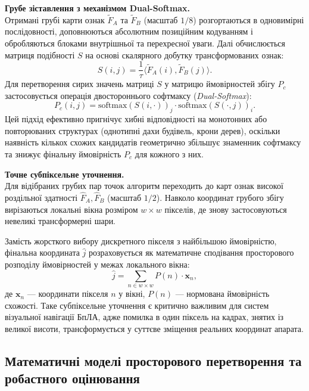 \documentclass[a4paper, 12pt, titlepage]{article}
\begin{document}
\textbf{Грубе зіставлення з механізмом Dual-Softmax.}\\
Отримані грубі карти ознак $\tilde{F}_A$ та $\tilde{F}_B$ (масштаб $1/8$) розгортаються в одновимірні послідовності, доповнюються абсолютним позиційним кодуванням і обробляються блоками внутрішньої та перехресної уваги. Далі обчислюється матриця подібності $S$ на основі скалярного добутку трансформованих ознак:
\begin{equation}
S(i, j) = \frac{1}{\tau} \langle \tilde{F}_A(i), \tilde{F}_B(j) \rangle.
\end{equation}
Для перетворення сирих значень матриці $S$ у матрицю ймовірностей збігу $P_c$ застосовується операція двостороннього софтмаксу (\textit{Dual-Softmax}):
\begin{equation}
P_{c}(i, j) = \text{softmax}(S(i, \cdot))_j \cdot \text{softmax}(S(\cdot, j))_i.
\end{equation}
Цей підхід ефективно пригнічує хибні відповідності на монотонних або повторюваних структурах (однотипні дахи будівель, крони дерев), оскільки наявність кількох схожих кандидатів геометрично збільшує знаменник софтмаксу та знижує фінальну ймовірність $P_c$ для кожного з них.

\textbf{Точне субпіксельне уточнення.}\\
Для відібраних грубих пар точок алгоритм переходить до карт ознак високої роздільної здатності $\hat{F}_A, \hat{F}_B$ (масштаб $1/2$). Навколо координат грубого збігу вирізаються локальні вікна розміром $w \times w$ пікселів, де знову застосовуються невеликі трансформерні шари.

Замість жорсткого вибору дискретного пікселя з найбільшою ймовірністю, фінальна координата $\hat{j}$ розраховується як математичне сподівання просторового розподілу ймовірностей у межах локального вікна:
\begin{equation}
\hat{j} = \sum_{n \in w \times w} P(n) \cdot \mathbf{x}_n,
\end{equation}
де $\mathbf{x}_n$ --- координати пікселя $n$ у вікні, $P(n)$ --- нормована ймовірність схожості. Таке субпіксельне уточнення є критично важливим для систем візуальної навігації БпЛА, адже помилка в один піксель на кадрах, знятих із великої висоти, трансформується у суттєве зміщення реальних координат апарата.

\subsection{Математичні моделі просторового перетворення та робастного оцінювання}
\end{document}

